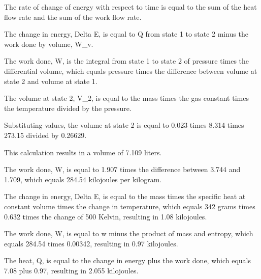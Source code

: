 The rate of change of energy with respect to time is equal to the sum of the heat flow rate and the sum of the work flow rate.

The change in energy, Delta E, is equal to Q from state 1 to state 2 minus the work done by volume, W_v.

The work done, W, is the integral from state 1 to state 2 of pressure times the differential volume, which equals pressure times the difference between volume at state 2 and volume at state 1.

The volume at state 2, V_2, is equal to the mass times the gas constant times the temperature divided by the pressure.

Substituting values, the volume at state 2 is equal to 0.023 times 8.314 times 273.15 divided by 0.26629.

This calculation results in a volume of 7.109 liters.

The work done, W, is equal to 1.907 times the difference between 3.744 and 1.709, which equals 284.54 kilojoules per kilogram.

The change in energy, Delta E, is equal to the mass times the specific heat at constant volume times the change in temperature, which equals 342 grams times 0.632 times the change of 500 Kelvin, resulting in 1.08 kilojoules.

The work done, W, is equal to w minus the product of mass and entropy, which equals 284.54 times 0.00342, resulting in 0.97 kilojoules.

The heat, Q, is equal to the change in energy plus the work done, which equals 7.08 plus 0.97, resulting in 2.055 kilojoules.